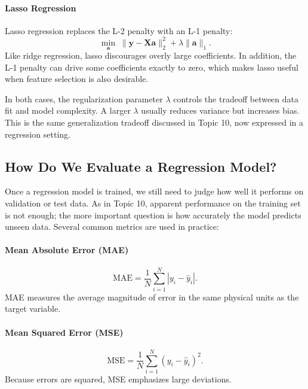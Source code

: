 \documentclass[12pt]{article}
\begin{document}
\paragraph{Lasso Regression}
Lasso regression replaces the L-2 penalty with an L-1 penalty:
\begin{equation}
\min_{\mathbf{a}} \; \|\mathbf{y} - \mathbf{X}\mathbf{a}\|_2^2 + \lambda \|\mathbf{a}\|_1.
\end{equation}
Like ridge regression, lasso discourages overly large coefficients. In addition, the L-1 penalty can drive some coefficients exactly to zero, which makes lasso useful when feature selection is also desirable.

In both cases, the regularization parameter $\lambda$ controls the tradeoff between data fit and model complexity. A larger $\lambda$ usually reduces variance but increases bias. This is the same generalization tradeoff discussed in Topic 10, now expressed in a regression setting.

\subsection{How Do We Evaluate a Regression Model?}

Once a regression model is trained, we still need to judge how well it performs on validation or test data. As in Topic 10, apparent performance on the training set is not enough; the more important question is how accurately the model predicts unseen data. Several common metrics are used in practice:

\paragraph{Mean Absolute Error (MAE)}
\begin{equation}
\mathrm{MAE} = \frac{1}{N}\sum_{i=1}^N |y_i - \hat{y}_i|.
\end{equation}
MAE measures the average magnitude of error in the same physical units as the target variable.

\paragraph{Mean Squared Error (MSE)}
\begin{equation}
\mathrm{MSE} = \frac{1}{N}\sum_{i=1}^N (y_i - \hat{y}_i)^2.
\end{equation}
Because errors are squared, MSE emphasizes large deviations.
\end{document}
